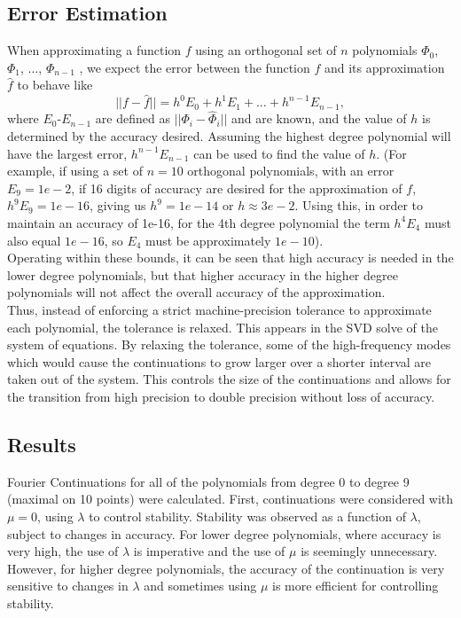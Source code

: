 \documentclass[11pt]{amsart}
\begin{document}
\subsection{Error Estimation}
When approximating a function $f$ using an orthogonal set of $n$ polynomials $\Phi_0$, $\Phi_1$, $\ldots$, $\Phi_{n-1}$ , we expect the error between the function $f$ and its approximation $\hat{f}$ to behave like
\begin{equation}
||f-\hat{f}|| = h^0 E_0 + h^1 E_1 + \ldots + h^{n-1} E_{n-1},
\end{equation} 
where $E_0$-$E_{n-1}$ are defined as $||\Phi_i-\hat{\Phi}_i||$ and are known, and the value of $h$ is determined by the accuracy desired. 
Assuming the highest degree polynomial will have the largest error, $h^{n-1}E_{n-1}$ can be used to find the value of $h$. 
(For example, if using a set of $n=10$ orthogonal polynomials, with an error $E_9=1e-2$, if 16 digits of accuracy are desired for the approximation of $f$, $h^9 E_9  = 1e-16$, giving us $h^9=1e-14$ or $h\approx 3e-2$.  Using this, in order to maintain an accuracy of 1e-16, for the 4th degree polynomial the term $h^4E_4$ must also equal $1e-16$, so $E_4$ must be approximately $1e-10$).  \\Operating within these bounds, it can be seen that high accuracy is needed in the lower degree polynomials, but that higher accuracy in the higher degree polynomials will not affect the overall accuracy of the approximation.  \\
Thus, instead of enforcing a strict machine-precision tolerance to approximate each polynomial, the tolerance is relaxed.  This appears in the SVD solve of the system of equations.  By relaxing the tolerance, some of the high-frequency modes which would cause the continuations to grow larger over a shorter interval are taken out of the system.  This controls the size of the continuations and allows for the transition from high precision to double precision without loss of accuracy.  

\subsection{Results} 
Fourier Continuations for all of the polynomials from degree 0 to degree 9 (maximal on 10 points) were calculated.  First, continuations were considered with $\mu=0$, using $\lambda$ to control stability. Stability was observed as a function of $\lambda$, subject to changes in accuracy.   For lower degree polynomials, where accuracy is very high, the use of $\lambda$ is imperative and the use of $\mu$ is seemingly unnecessary.  However, for higher degree polynomials, the accuracy of the continuation is very sensitive to changes in $\lambda$ and sometimes using $\mu$ is more efficient for controlling stability.  
\end{document}
